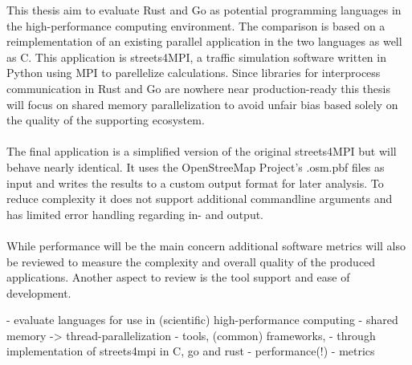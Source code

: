 This thesis aim to evaluate Rust and Go as potential programming languages in the high-performance computing environment. The comparison is based on a reimplementation of an existing parallel application in the two languages as well as C. This application is streets4MPI, a traffic simulation software written in Python using MPI to parellelize calculations. Since libraries for interprocess communication in Rust and Go are nowhere near production-ready this thesis will focus on shared memory parallelization to avoid unfair bias based solely on the quality of the supporting ecosystem.
\\ \\
The final application is a simplified version of the original streets4MPI but will behave nearly identical. It uses the OpenStreeMap Project's .osm.pbf files as input and writes the results to a custom output format for later analysis. To reduce complexity it does not support additional commandline arguments and has limited error handling regarding in- and output.
\\ \\
While performance will be the main concern additional software metrics will also be reviewed to measure the complexity and overall quality of the produced applications. Another aspect to review is the tool support and ease of development.

- evaluate languages for use in (scientific) high-performance computing
    - shared memory -> thread-parallelization
    - tools, (common) frameworks,
- through implementation of streets4mpi in C, go and rust
    - performance(!)
    - metrics

